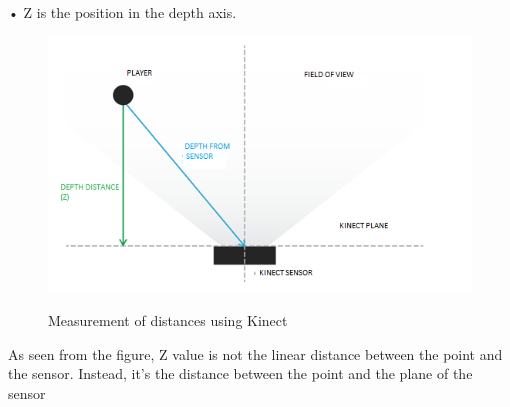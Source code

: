 •	Z is the position in the depth axis.


\begin{figure}[H]
\centering
{\includegraphics[scale=0.75]{figsensor.png}}
\caption{Measurement of distances using Kinect}
\end{figure}

\noindent As seen from the figure, Z value is not the linear distance between the point and the sensor. Instead, it’s the distance between the point and the plane of the sensor


